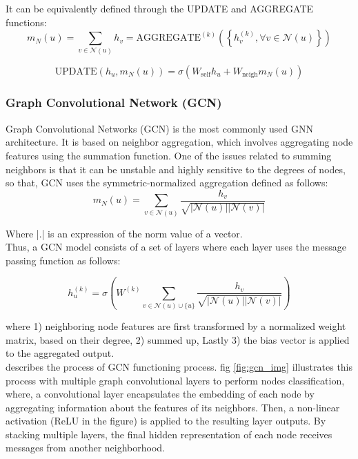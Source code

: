 It can be equivalently defined through the UPDATE and AGGREGATE functions:
\begin{equation}
m_N(u) = \sum_{v\in\mathcal{N}(u)} h_v = \text{AGGREGATE}^{(k)}\left(\left\{h^{(k)}_v, \forall v \in \mathcal{N}(u)\right\}\right)
\end{equation}

\begin{equation}
\text{UPDATE}(h_u, m_N(u)) = \sigma\left(W_{\text{self}}h_u + W_{\text{neigh}}m_N(u)\right)
\end{equation}


\subsubsection{Graph Convolutional Network (GCN) }
\label{gcn_dicription}

Graph Convolutional Networks (GCN) \cite{kipf} is the most commonly used GNN architecture. It is based on neighbor aggregation, which involves aggregating node features using the summation function. One of the issues related to summing neighbors is that it can be unstable and highly sensitive to the degrees of nodes, so that, GCN uses the symmetric-normalized aggregation defined as follows:
\begin{equation}
m_N(u) = \sum_{v \in \mathcal{N}(u)} \frac{h_v}{\sqrt{ |\mathcal{N}(u)||\mathcal{N}(v)|}}
\end{equation}

Where |.| is an expression of the norm value of a vector.\\
Thus, a GCN model consists of a set of layers where each layer uses the message passing function as follows:

\begin{equation}
h^{(k)}_u = \sigma\left(W^{(k)}
\sum_{v \in \mathcal{N}(u) \cup \{u\}} \frac{h_v}{\sqrt{|\mathcal{N}(u)||\mathcal{N}(v)|}}\right)
\end{equation}

where 1) neighboring node features are first transformed by a normalized weight matrix, based on their degree, 2) summed up, Lastly 3) the bias vector is applied to the aggregated output. \\
\cite{gnn_review1}  describes the process of GCN functioning process. fig \ref{fig:gcn_img} illustrates this process with multiple graph convolutional layers to perform nodes classification, where, a convolutional layer encapsulates the embedding of each node by aggregating information about the features of its neighbors. Then, a non-linear activation (ReLU in the figure) is applied to the resulting layer outputs. By stacking multiple layers, the final hidden representation of each node receives messages from another neighborhood.

